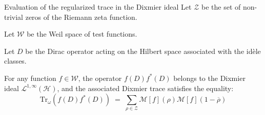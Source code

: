 \documentclass[Riemann_Hypothesis.tex]{subfiles}
\begin{document}
\begin{theoremEn}[label=th:TraceReg_Connes]{Evaluation of the regularized trace in the Dixmier ideal}
    Let $\mathcal{Z}$ be the set of non-trivial zeros of the Riemann zeta function. \par
    Let $\mathcal{W}$ be the Weil space of test functions. \par
    Let $D$ be the Dirac operator acting on the Hilbert space associated with the idèle classes. \par
    For any function $f \in \mathcal{W}$, the operator $f(D)f^*(D)$ belongs to the Dixmier ideal $\mathcal{L}^{1,\infty}(\mathcal{H})$, and the associated Dixmier trace satisfies the equality:
    \begin{equation*}
        \mathrm{Tr}_{\omega}\left(f(D)f^*(D)\right) \;=\; \sum_{\rho\in\mathcal{Z}} \mathcal{M}[f](\rho) \mathcal{M}[f](1-\overline{\rho})
    \end{equation*}
\end{theoremEn}
\end{document}
